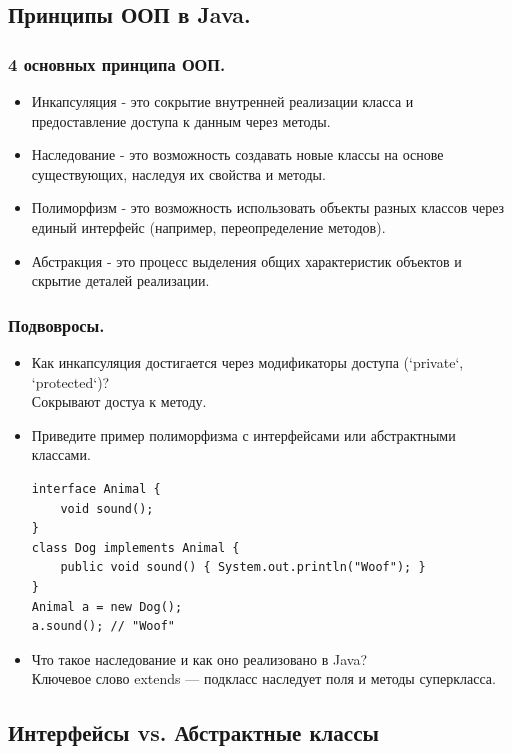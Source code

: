 \documentclass[a4paper,14pt]{article}
\begin{document}
    \subsection{Принципы ООП в Java.}
    
    \subsubsection*{4 основных принципа ООП.}
    \begin{itemize}
        \item Инкапсуляция - это сокрытие внутренней реализации класса и предоставление доступа к данным через методы.
        \item Наследование - это возможность создавать новые классы на основе существующих, наследуя их свойства и методы.
        \item Полиморфизм - это возможность использовать объекты разных классов через единый интерфейс (например, переопределение методов).
        \item Абстракция - это процесс выделения общих характеристик объектов и скрытие деталей реализации.
    \end{itemize}
    \subsubsection*{Подвовросы.}
    \begin{itemize}
        \item Как инкапсуляция достигается через модификаторы доступа (`private`, `protected`)? \\
        Сокрывают достуа к методу.
        \item Приведите пример полиморфизма с интерфейсами или абстрактными классами.
        \begin{lstlisting}[style=javastyle]
interface Animal {
    void sound(); 
}
class Dog implements Animal {
    public void sound() { System.out.println("Woof"); }
}
Animal a = new Dog();
a.sound(); // "Woof"
        \end{lstlisting}
        \item Что такое наследование и как оно реализовано в Java? \\
        Ключевое слово extends — подкласс наследует поля и методы суперкласса.
    \end{itemize}
    \subsection{Интерфейсы vs. Абстрактные классы}
\end{document}
